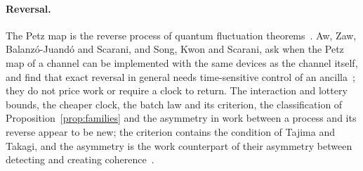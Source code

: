 \documentclass[11pt]{article}
\theoremstyle{definition}
\theoremstyle{remark}
\begin{document}
\paragraph{Reversal.} The Petz map is the reverse process of quantum fluctuation theorems~\cite{Crooks08,KwonKim19}. Aw, Zaw, Balanz\'o-Juand\'o and Scarani, and Song, Kwon and Scarani, ask when the Petz map of a channel can be implemented with the same devices as the channel itself, and find that exact reversal in general needs time-sensitive control of an ancilla~\cite{AwZawBalanzoScarani24,SongKwonScarani25}; they do not price work or require a clock to return. The interaction and lottery bounds, the cheaper clock, the batch law and its criterion, the classification of Proposition~\ref{prop:families} and the asymmetry in work between a process and its reverse appear to be new; the criterion contains the condition of Tajima and Takagi, and the asymmetry is the work counterpart of their asymmetry between detecting and creating coherence~\cite{TajimaTakagi25}.
\end{document}
